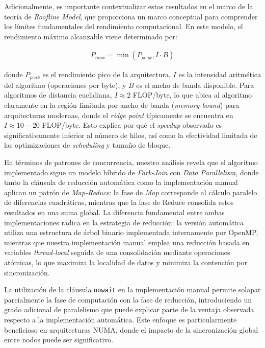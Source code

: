         Adicionalmente, es importante contextualizar estos resultados en el marco de la teoría de \textit{Roofline Model}, que proporciona un marco conceptual para comprender los límites fundamentales del rendimiento computacional. En este modelo, el rendimiento máximo alcanzable viene determinado por:
        
        \begin{align}
            P_{max} = \min(P_{peak}, I \cdot B)
        \end{align}
        
        donde $P_{peak}$ es el rendimiento pico de la arquitectura, $I$ es la intensidad aritmética del algoritmo (operaciones por byte), y $B$ es el ancho de banda disponible. Para algoritmos de distancia euclidiana, $I \approx 2$ FLOP/byte, lo que ubica al algoritmo claramente en la región limitada por ancho de banda (\textit{memory-bound}) para arquitecturas modernas, donde el \textit{ridge point} típicamente se encuentra en $I \approx 10-20$ FLOP/byte. Esto explica por qué el \textit{speedup} observado es significativamente inferior al número de hilos, así como la efectividad limitada de las optimizaciones de \textit{scheduling} y tamaño de bloque.
        
        En términos de patrones de concurrencia, nuestro análisis revela que el algoritmo implementado sigue un modelo híbrido de \textit{Fork-Join} con \textit{Data Parallelism}, donde tanto la cláusula de reducción automática como la implementación manual aplican un patrón de \textit{Map-Reduce}: la fase de \textit{Map} corresponde al cálculo paralelo de diferencias cuadráticas, mientras que la fase de Reduce consolida estos resultados en una suma global. La diferencia fundamental entre ambas implementaciones radica en la estrategia de reducción: la versión automática utiliza una estructura de árbol binario implementada internamente por OpenMP, mientras que nuestra implementación manual emplea una reducción basada en variables \textit{thread-local} seguida de una consolidación mediante operaciones atómicas, lo que maximiza la localidad de datos y minimiza la contención por sincronización.
        
        La utilización de la cláusula \texttt{nowait} en la implementación manual permite solapar parcialmente la fase de computación con la fase de reducción, introduciendo un grado adicional de paralelismo que puede explicar parte de la ventaja observada respecto a la implementación automática. Este enfoque es particularmente beneficioso en arquitecturas NUMA, donde el impacto de la sincronización global entre nodos puede ser significativo.
        

